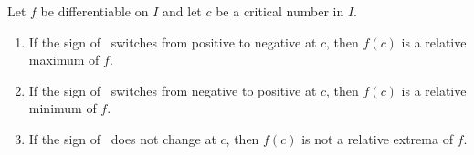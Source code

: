%
{Let $f$ be differentiable on $I$ and let $c$ be a critical number in $I$.
\begin{enumerate}
\item		If the sign of \fp\ switches from positive to negative at $c$, then $f(c)$ is a relative maximum of $f$.
\item		If the sign of \fp\ switches from negative to positive at $c$, then $f(c)$ is a relative minimum of $f$.
\item		If the sign of \fp\ does not change at $c$, then $f(c)$ is not a relative extrema of $f$.
\end{enumerate}
}
\normalsize
\restoreboxwidth

